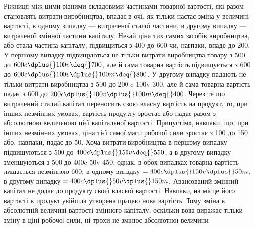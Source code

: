 Ріжниця між цими різними складовими частинами товарної
вартості, які разом становлять витрати виробництва, впадає
в очі, як тільки настає зміна у величині вартості, в одному випадку
— витраченої сталої частини, в другому випадку — витраченої
змінної частини капіталу. Нехай ціна тих самих засобів виробництва,
або стала частина капіталу, підвищиться з 400 до 600 чи, навпаки, впаде до
200. У першому випадку підвищуються не
тільки витрати виробництва товару з 500 до
$600 c \dplus{} 100v \deq{} 700$, але й сама товарна вартість
підвищується з 600 до $600 c \dplus{} 100 v \dplus{} 100 m \deq{} 800$.
У другому випадку падають не тільки витрати виробництва з 500 до 200 c \dplus{} 100v \deq{}
300, але й сама товарна вартість падає з
600 до $200c \dplus{} 100v \dplus{} 100m \deq{} 400$.
Через те що витрачений сталий капітал переносить свою
власну вартість на продукт, то, при інших незмінних умовах, вартість
продукту зростає або падає разом з абсолютною величиною
цієї капітальної вартості. Припустімо, навпаки, що, при
інших незмінних умовах, ціна тієї самої маси робочої сили зростає
з 100 до 150 або,
навпаки, падає до 50. Хоча витрати виробництва
в першому випадку підвищуються з 500
до $400 c \dplus{} 150 v \deq{} 550$, а в другому випадку
зменшуються з 500 до 400c \dplus{} 50v \deq{} 450, однак, в обох випадках товарна вартість лишається
незмінною \deq{} 600; в одному випадку
$= 400c \dplus{} 150v \dplus{} 50 m$, в другому випадку $= 400c \dplus{} 50v \dplus{} 150m$.
Авансований змінний капітал не додає до продукту своєї власної
вартості. Навпаки, на місце його вартості в продукт увійшла утворена
працею нова вартість. Тому зміна в абсолютній величині
вартості змінного капіталу, оскільки вона виражає тільки зміну
в ціні робочої сили, ні трохи не змінює абсолютної величини
\parbreak{}  %
